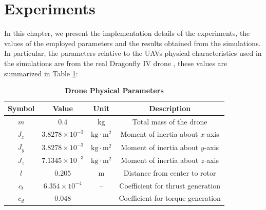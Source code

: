 \documentclass[main]{subfiles}
\begin{document}
\section{Experiments}
In this chapter, we present the implementation details of the experiments,
the values of the employed parameters and the results obtained from the simulations.
In particular, the parameters relative to the UAVs physical
characteristics used in the simulations are from 
the real Dragonfly IV drone \cite{drone}, these values are
summarized in Table \ref{tab:drone_parameters}:
\begin{table}[H]
\centering
\caption{\textbf{Drone Physical Parameters}}
\begin{tabular}{c c c c}
\hline\hline
\textbf{Symbol}  & \textbf{Value}       & \textbf{Unit}         & \textbf{Description} \\ \hline\hline
\(m\)           & \(0.4\)              & \(\text{kg}\)          & Total mass of the drone \\
\(J_x\)         & \(3.8278 \times 10^{-3}\) & \(\text{kg}\cdot\text{m}^2\) & Moment of inertia about $x$-axis \\
\(J_y\)         & \(3.8278 \times 10^{-3}\) & \(\text{kg}\cdot\text{m}^2\) & Moment of inertia about $y$-axis \\
\(J_z\)         & \(7.1345 \times 10^{-3}\) & \(\text{kg}\cdot\text{m}^2\) & Moment of inertia about $z$-axis \\
\(l\)           & \(0.205\)            & \(\text{m}\)           & Distance from center to rotor \\
\(c_t\)         & \(6.354 \times 10^{-4}\) & --                     & Coefficient for thrust generation \\
\(c_d\)         & \(0.048\)            & --                     & Coefficient for torque generation \\
\hline\hline
\end{tabular}
\label{tab:drone_parameters}
\end{table}
\end{document}
